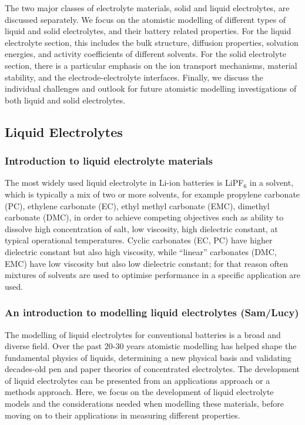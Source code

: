 \documentclass[../main.tex]{subfiles}
\begin{document}
The two major classes of electrolyte materials, solid and liquid electrolytes, are discussed separately. We focus on the atomistic modelling of different types of liquid and solid electrolytes, and their battery related properties. For the liquid electrolyte section, this includes the bulk structure, diffusion properties, solvation energies, and activity coefficients of different solvents. For the solid electrolyte section, there is a particular emphasis on the ion transport mechanisms, material stability, and the electrode-electrolyte interfaces. Finally, we discuss the individual challenges and outlook for future atomistic modelling investigations of both liquid and solid electrolytes.

\subsection{Liquid Electrolytes}
\label{sec:Liquid_electrolytes}
\subsubsection{Introduction to liquid electrolyte materials}
The most widely used liquid electrolyte in Li-ion batteries is LiPF$_6$ in a solvent, which is typically a mix of two or more solvents, for example propylene carbonate (PC), ethylene carbonate (EC), ethyl methyl carbonate (EMC), dimethyl carbonate (DMC), in order to achieve competing objectives such as ability to dissolve high concentration of salt, low viscosity, high dielectric constant, at typical operational temperatures.\cite{Xu2004,Xu2014} Cyclic carbonates (EC, PC) have higher dielectric constant but also high viscosity, while ``linear'' carbonates (DMC, EMC) have low viscosity but also low dielectric constant; for that reason often mixtures of solvents are used to optimise performance in a specific application are used.


\subsubsection{An introduction to modelling liquid electrolytes (Sam/Lucy)}
The modelling of liquid electrolytes for conventional batteries is a broad and diverse field. Over the past 20-30 years atomistic modelling has helped shape the fundamental physics of liquids, determining a new physical basis and validating decades-old pen and paper theories of concentrated electrolytes. \cite{qian2015high,kim2015situ,zhou2009atomistic,enderby1981structure} The development of liquid electrolytes can be presented from an applications approach or a methods approach. Here, we focus on the development of liquid electrolyte models and the considerations needed when modelling these materials, before moving on to their applications in measuring different properties.
\end{document}
